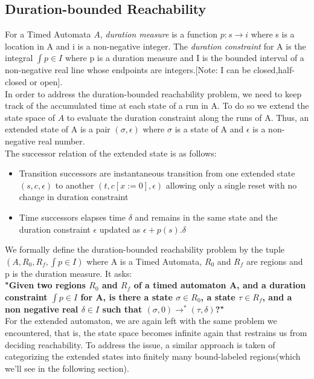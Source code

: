 \documentclass[a4paper,UKenglish,cleveref, autoref, thm-restate]{lipics-v2019}
\begin{document}
\subsection{Duration-bounded Reachability}
For a Timed Automata $A$, \textit{duration measure} is a function $p : s \rightarrow i$ where s is a location in A and i is a non-negative integer. The \textit{duration constraint} for A is the integral $\int p \in I$ where p is a duration measure and I is the bounded interval of a non-negative real line whose endpoints are integers.[Note: I can be closed,half-closed or open].\\
In order to address the duration-bounded reachability problem, we need to keep track of the accumulated time at each state of a run in A. To do so we extend the state space of $A$ to evaluate the duration constraint along the runs of A. Thus, an extended state of A is a pair $(\sigma,\epsilon)$ where $\sigma$ is a state of A and $\epsilon$ is a non-negative real number.\\
The successor relation of the extended state is as follows:
\begin{itemize}
\item Transition successors are instantaneous transition from one extended state $(s,c,\epsilon)$ to another $(t,c[x:=0],\epsilon)$ allowing only a single reset with no change in duration constraint
\item Time successors elapses time $\delta$ and remains in the same state and the duration constraint $\epsilon$ updated as $\epsilon + p(s).\delta$
\smallskip
\end{itemize}
We formally define the duration-bounded reachability problem by the tuple $(A,R_0,R_f,\int p \in I)$ where A is a Timed Automata, $R_0$ and $R_f$ are regions and p is the duration measure. It asks:\\
\textbf{"Given two regions $R_0$ and $R_f$ of a timed automaton A, and a duration constraint $\int p \in I$ for A, is there a state $\sigma \in R_0$, a state
$\tau \in R_f$, and a non negative real $\delta \in I$ such that $(\sigma,0)\rightarrow^* (\tau,\delta)$?"}\\
For the extended automaton, we are again left with the same problem we encountered, that is, the state space becomes infinite again that restrains us from deciding reachability. To address the issue, a similar approach is taken of categorizing the extended states into finitely many bound-labeled regions(which we'll see in the following section).
\end{document}
